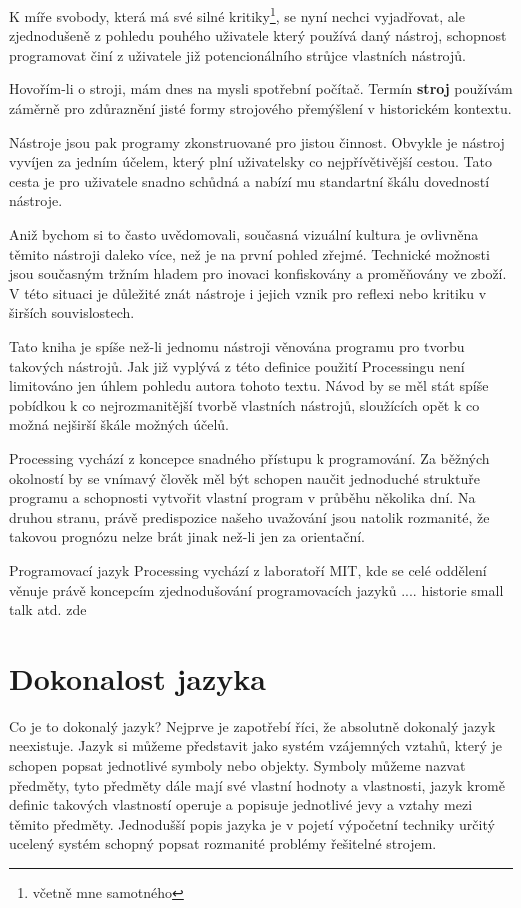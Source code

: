 \documentclass[11pt]{book}
\newcommand{\oddil}[1]{\section{#1}\label{sec:#1}}
\newcommand{\slovnik}[1]{\textbf{\gls{#1}}\index{#1}}
\begin{document}
K míře svobody, která má své silné kritiky\footnote{včetně mne samotného}, se nyní nechci vyjadřovat, ale zjednodušeně z pohledu pouhého uživatele který používá daný nástroj, schopnost programovat činí z uživatele již potencionálního strůjce vlastních nástrojů.

Hovořím-li o stroji, mám dnes na mysli spotřební počítač. Termín \slovnik{stroj} používám záměrně pro zdůraznění jisté formy strojového přemýšlení v historickém kontextu.

Nástroje jsou pak programy zkonstruované pro jistou činnost. Obvykle je nástroj vyvíjen za jedním účelem, který plní uživatelsky co nejpřívětivější cestou. Tato cesta je pro uživatele snadno schůdná a nabízí mu standartní škálu dovedností nástroje.

Aniž bychom si to často uvědomovali, současná vizuální kultura je ovlivněna těmito nástroji daleko více, než je na první pohled zřejmé. Technické možnosti jsou současným tržním hladem pro inovaci konfiskovány a proměňovány ve zboží. V této situaci je důležité znát nástroje i jejich vznik pro reflexi nebo kritiku v širších souvislostech.

Tato kniha je spíše než-li jednomu nástroji věnována programu pro tvorbu takových nástrojů. Jak již vyplývá z této definice použití Processingu není limitováno jen úhlem pohledu autora tohoto textu. Návod by se měl stát spíše pobídkou k co nejrozmanitější tvorbě vlastních nástrojů, sloužících opět k co možná nejširší škále možných účelů.

Processing vychází z koncepce snadného přístupu k programování. Za běžných okolností by se vnímavý člověk měl být schopen naučit jednoduché struktuře programu a schopnosti vytvořit vlastní program v průběhu několika dní. Na druhou stranu, právě predispozice našeho uvažování jsou natolik rozmanité, že takovou prognózu nelze brát jinak než-li jen za orientační.


Programovací jazyk Processing vychází z laboratoří MIT, kde se celé oddělení věnuje právě koncepcím zjednodušování programovacích jazyků .... historie small talk atd. zde


\oddil{Dokonalost jazyka}

Co je to dokonalý jazyk? Nejprve je zapotřebí říci, že absolutně dokonalý jazyk neexistuje. Jazyk si můžeme představit jako systém vzájemných vztahů, který je schopen popsat jednotlivé symboly nebo objekty. Symboly můžeme nazvat předměty, tyto předměty dále mají své vlastní hodnoty a vlastnosti, jazyk kromě definic takových vlastností operuje a popisuje jednotlivé jevy a vztahy mezi těmito předměty. Jednodušší popis jazyka je v pojetí výpočetní techniky určitý ucelený systém schopný popsat rozmanité problémy řešitelné strojem.
\end{document}
